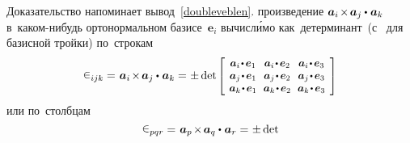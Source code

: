 \begin{otherlanguage}{russian}
Доказательство напоминает вывод~\eqref{doubleveblen}.  произведение ${\bm{a}_i \hspace{-0.25ex} \times \hspace{-0.25ex} \bm{a}_j \dotp \hspace{0.1ex} \bm{a}_k}$ в~каком\hbox{-}нибудь орто\-нормаль\-ном базисе~${\bm{e}_i}$ вычисл\'{и}мо как~детерминант~(с~\inquotes{$-$} для~ базисной тройки) по~строкам
\vspace{-0.4em}\[
\levicivita_{ijk} =\hspace{0.16ex} \bm{a}_i \hspace{-0.25ex} \times \hspace{-0.25ex} \bm{a}_j \dotp \hspace{0.1ex} \bm{a}_k =
\hspace{0.1ex} \pm \operatorname{det}\hspace{-0.1ex}
\scalebox{0.92}[0.92]{$\left[\hspace{-0.2ex}\begin{array}{c@{\hspace{0.64em}}c@{\hspace{0.64em}}c}
\bm{a}_i \narrowdotp\hspace{0.12ex} \bm{e}_1 & \bm{a}_i \narrowdotp\hspace{0.12ex} \bm{e}_2 & \bm{a}_i \narrowdotp\hspace{0.12ex} \bm{e}_3 \\
\bm{a}_j \narrowdotp\hspace{0.12ex} \bm{e}_1 & \bm{a}_j \narrowdotp\hspace{0.12ex} \bm{e}_2 & \bm{a}_j \narrowdotp\hspace{0.12ex} \bm{e}_3 \\
\bm{a}_k \narrowdotp\hspace{0.12ex} \bm{e}_1 & \bm{a}_k \narrowdotp\hspace{0.12ex} \bm{e}_2 & \bm{a}_k \narrowdotp\hspace{0.12ex} \bm{e}_3
\end{array}\hspace{-0.12ex}\right]$}
\]
или по~столбцам
\vspace{-0.4em}\[
\levicivita_{pqr} =\hspace{0.16ex} \bm{a}_p \hspace{-0.25ex} \times \hspace{-0.25ex} \bm{a}_q \dotp \hspace{0.1ex} \bm{a}_r =
\hspace{0.1ex} \pm \operatorname{det}\hspace{-0.1ex}
\]
\end{otherlanguage}
